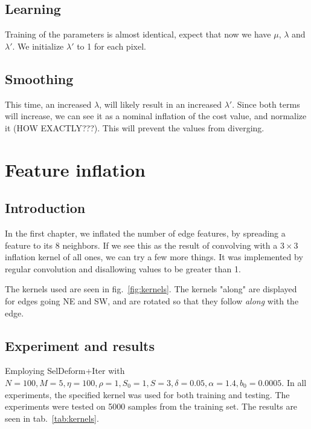 \documentclass{report}
\begin{document}
\section{Learning}
Training of the parameters is almost identical, expect that now we have $\mu$, $\lambda$ and $\lambda'$. We initialize $\lambda'$ to 1 for each pixel.

\section{Smoothing}
This time, an increased $\lambda$, will likely result in an increased $\lambda'$. Since both terms will increase, we can see it as a nominal inflation of the cost value, and normalize it (HOW EXACTLY???). This will prevent the values from diverging.

\chapter{Feature inflation}

\section{Introduction}
In the first chapter, we inflated the number of edge features, by spreading a feature to its 8 neighbors. If we see this as the result of convolving with a $3\times 3$ inflation kernel of all ones, we can try a few more things. It was implemented by regular convolution and disallowing values to be greater than 1. 

The kernels used are seen in fig.~\ref{fig:kernels}. The kernels "along" are displayed for edges going NE and SW, and are rotated so that they follow {\em along} with the edge.

\section{Experiment and results}
Employing SelDeform+Iter with $N=100, M=5, \eta=100, \rho=1, S_0=1, S=3, \delta=0.05, \alpha=1.4, b_0 = 0.0005$. In all experiments, the specified kernel was used for both training and testing. The experiments were tested on 5000 samples from the training set. The results are seen in tab.~\ref{tab:kernels}.
\end{document}
